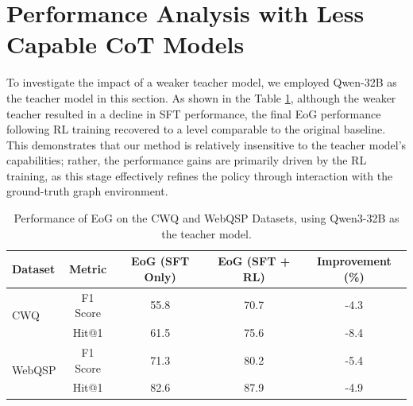\section{Performance Analysis with Less Capable CoT Models}

To investigate the impact of a weaker teacher model, we employed Qwen-32B as the teacher model in this section. As shown in the Table \ref{tab:eog_qwen3_performance}, although the weaker teacher resulted in a decline in SFT performance, the final EoG performance following RL training recovered to a level comparable to the original baseline. This demonstrates that our method is relatively insensitive to the teacher model's capabilities; rather, the performance gains are primarily driven by the RL training, as this stage effectively refines the policy through interaction with the ground-truth graph environment.
\begin{table}[htbp]
    \centering
    \caption{Performance of EoG on the CWQ and WebQSP Datasets, using Qwen3-32B as the teacher model.}
    \label{tab:eog_qwen3_performance}
    \begin{tabular}{l c c c c}
        \toprule
        Dataset & Metric & EoG (SFT Only) & EoG (SFT + RL) & Improvement (\%) \\
        \midrule
        \multirow{2}{*}{CWQ} 
        & F1 Score & 55.8 & 70.7 & -4.3 \\
        & Hit@1 & 61.5 & 75.6 & -8.4 \\
        \midrule
        \multirow{2}{*}{WebQSP} 
        & F1 Score & 71.3 & 80.2 & -5.4 \\
        & Hit@1 & 82.6 & 87.9 & -4.9 \\
        \bottomrule
    \end{tabular}
\end{table}






